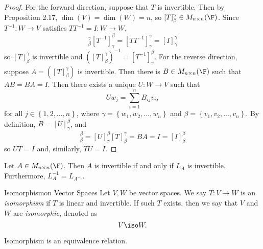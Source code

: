 \documentclass[linearalgebraI]{subfiles}
\begin{document}
    \begin{proof}
        For the forward direction, suppose that $T$ is invertible. Then by Proposition 2.17, $\dim(V) = \dim(W) = n$, so $[T]^\gamma_\beta \in M_{n\times n}(\F)$. Since $T^{-1}: W\to V$ satisfies $TT^{-1} = I: W\to W$,
        \begin{equation*}
            [T]^\gamma_\beta [T^{-1}]^\beta_\gamma = [TT^{-1}]^\gamma_\gamma = [I]^\gamma_\gamma
        \end{equation*}
        so $[T]^\gamma_\beta$ is invertible and $\left( [T]^\gamma_\beta \right)^{-1} = \left[ T^{-1} \right] ^\beta_\gamma$. For the reverse direction, suppose $A = \left( [T]^\gamma_\beta \right)$ is invertible. Then there is $B\in M_{n\times n}(\F)$ such that $AB = BA = I$. Then there exists a unique $U:W\to V$ such that
        \begin{equation*}
            Uw_j = \sum^{n}_{i=1} B_{ij}v_i,
        \end{equation*}
        for all $j\in\left\lbrace 1,2,\ldots,n \right\rbrace$, where $\gamma = \left\lbrace w_1, w_2, \ldots, w_n \right\rbrace$ and $\beta = \left\lbrace v_1, v_2, \ldots, v_n \right\rbrace$. By definition, $B = [U]^\beta_\gamma$, and
        \begin{equation*}
            [UT]^\beta_\beta = [U]^\beta_\gamma [T]^\gamma_\beta = BA = I = [I]^\beta_\beta
        \end{equation*}
        so $UT = I$ and, similarly, $TU = I$.
    \end{proof}

    \begin{cor}{}
        Let $A\in M_{n\times n}(\F)$. Then $A$ is invertible if and only if $L_A$ is invertible. Furthermore, $L_A^{-1} = L_{A^{-1}}$.
    \end{cor}	

    \begin{definition}{Isomorphism}{on Vector Spaces}
        Let $V, W$ be vector spaces. We say $T:V\to W$ is an \emph{isomorphism} if $T$ is linear and invertible. If such $T$ exists, then we say that $V$ and $W$ are \emph{isomorphic}, denoted as
        \begin{equation*}
            V\iso W.
        \end{equation*}
    \end{definition}

    \begin{remark}
        Isomorphism is an equivalence relation.
    \end{remark}
\end{document}
